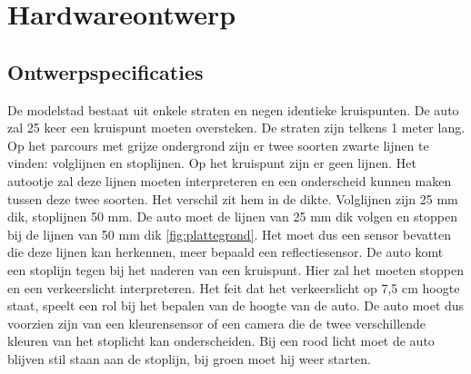 \documentclass[a4paper,twoside,kulak]{kulakreport} %
\begin{document}
\section{Hardwareontwerp} \label{Hardwareontwerp}

\subsection{Ontwerpspecificaties} \label{Ontwerpspecificaties}


De modelstad bestaat uit enkele straten en negen identieke kruispunten. De auto zal 25 keer een kruispunt moeten oversteken. De straten zijn telkens 1 meter lang. Op het parcours met grijze ondergrond zijn er twee soorten zwarte lijnen te vinden: volglijnen en stoplijnen. Op het kruispunt  zijn er geen lijnen. Het autootje zal deze lijnen moeten interpreteren en een onderscheid kunnen maken tussen deze twee soorten. Het verschil zit hem in de dikte. Volglijnen zijn 25 mm dik, stoplijnen 50 mm. De auto moet de lijnen van 25 mm dik volgen en stoppen bij de lijnen van 50 mm dik \ref{fig:plattegrond}. Het moet dus een sensor bevatten die deze lijnen kan herkennen, meer bepaald een reflectiesensor. De auto komt een stoplijn tegen bij het naderen van een kruispunt. Hier zal het moeten stoppen en een verkeerslicht interpreteren. Het feit dat het verkeerslicht op 7,5 cm hoogte staat, speelt een rol bij het bepalen van de hoogte van de auto. De auto moet dus voorzien zijn van een kleurensensor of een camera die de twee verschillende kleuren van het stoplicht kan onderscheiden. Bij een rood licht moet de auto blijven stil staan aan de stoplijn, bij groen moet hij weer starten. 
\end{document}

